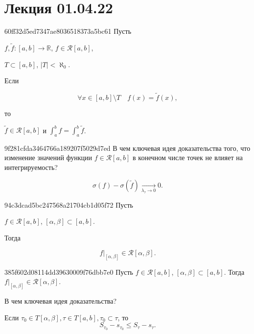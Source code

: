 \section{Лекция 01.04.22}
\begin{note}{60ff32d5ed7347ae8036518373a5bc61}
    Пусть \begin{icloze}{3}\({ f, \tilde f : [a, b] \to \mathbb R }\),\: \({ f \in  \mathcal R[a, b] }\),\end{icloze}\: \begin{icloze}{4}\({ T \subset [a, b] }\),\: \({ \left\lvert T \right\rvert < \aleph_0 }\).\end{icloze} Если
    \begin{icloze}{1}
        \[
            \forall x \in [a, b] \setminus T \quad f(x) = \tilde f(x),
        \]
    \end{icloze}
    то \begin{icloze}{2}\({ \tilde f \in \mathcal R[a, b] }\) и \({ \int_{a}^{b} f = \int_{a}^{b} \tilde f }\).\end{icloze}
\end{note}

\begin{note}{9f281cfda3464766a189207f5029d7ed}
    В чем ключевая идея доказательства того, что изменение значений функции \({ f \in\mathcal R[a, b] }\) в конечном числе точек не влияет на интегрируемость?

    \begin{cloze}{1}
        \[
            \sigma(f) - \sigma(\tilde f) \underset{\lambda_\tau \to 0}\longrightarrow 0.
        \]
    \end{cloze}
\end{note}

\begin{note}{94c3dcad5bc247568a21704cb1d05f72}
    Пусть \begin{icloze}{2}\({ f \in \mathcal R[a, b] }\), \({ [\alpha, \beta] \subset [a, b] }\).\end{icloze} Тогда
    \begin{icloze}{1}
        \[
            f |_{[\alpha, \beta]} \in \mathcal R[\alpha, \beta].
        \]
    \end{icloze}
\end{note}

\begin{note}{385f602d08114dd39630009f76dbb7e0}
    Пусть \({ f \in \mathcal R[a, b] }\), \({ [\alpha,  \beta]   \subset [a, b] }\). Тогда \({ f|_{[\alpha, \beta]} \in \mathcal R[\alpha, \beta] }\).

    В чем ключевая идея доказательства?

    \begin{cloze}{1}
        Если \({ \tau_0 \in T[\alpha, \beta], \tau \in T[a, b], \tau_0 \subset \tau }\), то
        \[
            S_{\tau_0} - s_{\tau_0} \leqslant S_{\tau} - s_{\tau}.
        \]
    \end{cloze}
\end{note}

